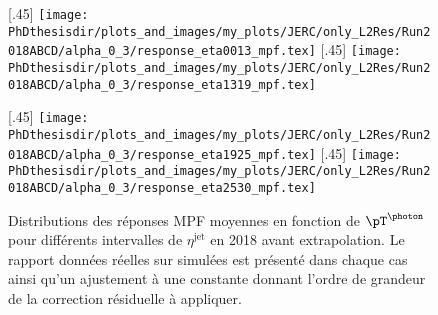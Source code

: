 \begin{figure}[p]
\centering
{}[.45\textwidth]
{\texttt{[image: \\PhDthesisdir/plots\_and\_images/my\_plots/JERC/only\_L2Res/Run2018ABCD/alpha\_0\_3/response\_eta0013\_mpf.tex]}}
\hfill
{}[.45\textwidth]
{\texttt{[image: \\PhDthesisdir/plots\_and\_images/my\_plots/JERC/only\_L2Res/Run2018ABCD/alpha\_0\_3/response\_eta1319\_mpf.tex]}}

\vfill

[.45\textwidth]
{\texttt{[image: \\PhDthesisdir/plots\_and\_images/my\_plots/JERC/only\_L2Res/Run2018ABCD/alpha\_0\_3/response\_eta1925\_mpf.tex]}}
\hfill
{}[.45\textwidth]
{\texttt{[image: \\PhDthesisdir/plots\_and\_images/my\_plots/JERC/only\_L2Res/Run2018ABCD/alpha\_0\_3/response\_eta2530\_mpf.tex]}}

\caption[Réponses MPF en 2018 avant extrapolation.]{Distributions des réponses MPF moyennes en fonction de $\pT^{\text{\photon}}$ pour différents intervalles de $\eta^\text{jet}$ en 2018 avant extrapolation. Le rapport données réelles sur simulées est présenté dans chaque cas ainsi qu'un ajustement à une constante donnant l'ordre de grandeur de la correction résiduelle à appliquer.}
\label{fig-responses_MPF_alpha_0_3_2018ABCD}
\end{figure}